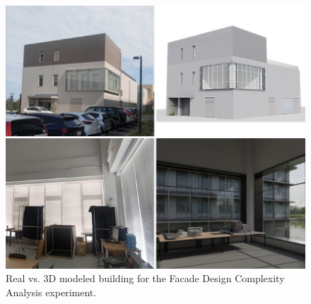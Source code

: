 %    


    \begin{figure}[htb]
        \centering
        \includegraphics[width= \linewidth]{Images/Realvs3DmodelBlender}
        \caption{Real vs. 3D modeled building for the Facade Design Complexity Analysis experiment.}
        \label{fig:RealVs3dModel}
    \end{figure}


